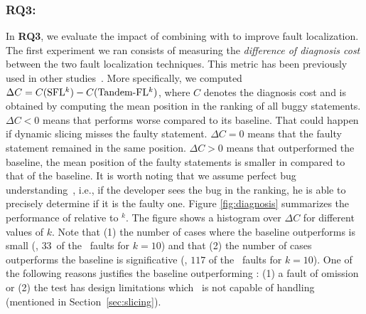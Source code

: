 \documentclass{article}
\begin{document}
\subsubsection{RQ3: \textit{\rqthree}}

\newcommand{\numOutPerformed}{$33$}%
\newcommand{\numEquallyPerformed}{$110$}%


In \textbf{RQ3}, we evaluate the impact of combining \ds{} with \sfl{}
to improve fault localization. The first experiment we ran consists of
measuring the \emph{difference of diagnosis cost} between the two
fault localization techniques. This metric has been previously used in
other
studies~\cite{7390282,ang-perez-van-deursen-rui-2017,Pearson:2017:EIF:3097368.3097441,Perez:2018:LQR:3304889.3304927}.
More specifically, we computed $\Delta{}C = C(\textrm{SFL$^{k}$}) -
C(\textrm{Tandem-FL$^{k}$})$, where $C$ denotes the diagnosis cost and is
obtained by computing the mean position in the ranking of all buggy
statements. $\Delta C <0$ means that  performs worse
compared to its baseline. That could happen if dynamic slicing misses
the faulty statement. $\Delta C=0$ means that the faulty statement
remained in the same position. $\Delta C >0$ means that 
outperformed the baseline, \ie{} the mean position of the faulty
statements is smaller in  compared to that of the
baseline. It is worth noting that we assume perfect bug
understanding~\cite{Parnin:2011:ADT:2001420.2001445}, i.e., if the
developer sees the bug in the ranking, he is able to precisely
determine if it is the faulty one.  Figure \ref{fig:diagnosis}
summarizes the performance of  relative to
\sfl{}$^{k}$. The figure shows a histogram over $\Delta{}C$ for
different values of $k$. Note that (1) the number of cases where the
baseline outperforms  is small (\eg{}, \numOutPerformed\ of
the \numFaults\ faults for $k=10$) and that (2) the number of cases
 outperforms the baseline is significative (\eg{}, $117$ of
the \numFaults\ faults for $k=10$). One
of the following reasons justifies the baseline outperforming
: (1)
a fault of omission or (2) the test has design limitations which \ds~is
not capable of handling (mentioned in Section~\ref{sec:slicing}).

\end{document}
